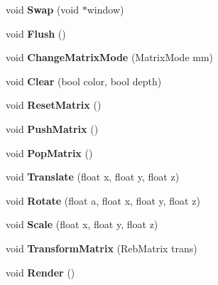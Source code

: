 \begin{DoxyCompactItemize}
\item 
void {\bfseries Swap} (void $\ast$window)\hypertarget{class_reb_g_l_a314341db9e01ae7524be31cbb3517fa3}{}\label{class_reb_g_l_a314341db9e01ae7524be31cbb3517fa3}

\item 
void {\bfseries Flush} ()\hypertarget{class_reb_g_l_ac3d7e746a8a7bdaed15eb8ab20cd49b4}{}\label{class_reb_g_l_ac3d7e746a8a7bdaed15eb8ab20cd49b4}

\item 
void {\bfseries Change\+Matrix\+Mode} (Matrix\+Mode mm)\hypertarget{class_reb_g_l_a7c2441b43206b08d065eeaa28d257f44}{}\label{class_reb_g_l_a7c2441b43206b08d065eeaa28d257f44}

\item 
void {\bfseries Clear} (bool color, bool depth)\hypertarget{class_reb_g_l_aa3d7ecf92da99701199e0eea7cadcbcc}{}\label{class_reb_g_l_aa3d7ecf92da99701199e0eea7cadcbcc}

\item 
void {\bfseries Reset\+Matrix} ()\hypertarget{class_reb_g_l_a16f123579c1389a6651d8349495e6151}{}\label{class_reb_g_l_a16f123579c1389a6651d8349495e6151}

\item 
void {\bfseries Push\+Matrix} ()\hypertarget{class_reb_g_l_a8961df2885af7786b680e37966d1df8c}{}\label{class_reb_g_l_a8961df2885af7786b680e37966d1df8c}

\item 
void {\bfseries Pop\+Matrix} ()\hypertarget{class_reb_g_l_a7c2ae8f5d84dedd392a3dc397e4e9137}{}\label{class_reb_g_l_a7c2ae8f5d84dedd392a3dc397e4e9137}

\item 
void {\bfseries Translate} (float x, float y, float z)\hypertarget{class_reb_g_l_ad92c75ccb58745300b782ee6c035bbb9}{}\label{class_reb_g_l_ad92c75ccb58745300b782ee6c035bbb9}

\item 
void {\bfseries Rotate} (float a, float x, float y, float z)\hypertarget{class_reb_g_l_a9730d66e4fc0c06639b22ef0a59b2116}{}\label{class_reb_g_l_a9730d66e4fc0c06639b22ef0a59b2116}

\item 
void {\bfseries Scale} (float x, float y, float z)\hypertarget{class_reb_g_l_a1c2e6ebbae091be86d92490c19ab1caa}{}\label{class_reb_g_l_a1c2e6ebbae091be86d92490c19ab1caa}

\item 
void {\bfseries Transform\+Matrix} (Reb\+Matrix trans)\hypertarget{class_reb_g_l_a8025765ae6d7f3a3dbed9d9fded4921d}{}\label{class_reb_g_l_a8025765ae6d7f3a3dbed9d9fded4921d}

\item 
void {\bfseries Render} ()\hypertarget{class_reb_g_l_a17ca1f72cbc6d23cbf149bbd736b6caa}{}\label{class_reb_g_l_a17ca1f72cbc6d23cbf149bbd736b6caa}

\end{DoxyCompactItemize}


